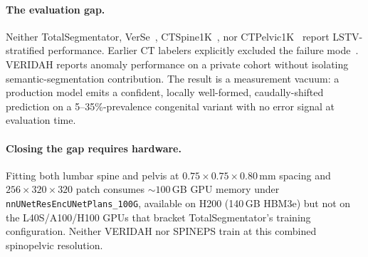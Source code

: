 \documentclass{article}
\newcommand{\SOTA}{TotalSegmentator}
\newcommand{\VERIDAH}{VERIDAH}
\newcommand{\VerSe}{VerSe}
\begin{document}
\paragraph{The evaluation gap.}
Neither \SOTA{}, \VerSe{}~\citep{Sekuboyina2021VerSe:Images},
CTSpine1K~\citep{Deng2021CTSpine1K:Tomography}, nor
CTPelvic1K~\citep{Liu2021DeepModels} report LSTV-stratified
performance. Earlier CT labelers explicitly excluded the
failure mode~\citep{Sekuboyina2020LabelingAnatomy}.
\VERIDAH{} reports anomaly performance on a private cohort
without isolating semantic-segmentation contribution. The
result is a measurement vacuum: a production model emits a
confident, locally well-formed, caudally-shifted prediction
on a 5--35\%-prevalence congenital variant with no error
signal at evaluation time.

\paragraph{Closing the gap requires hardware.}
Fitting both lumbar spine and pelvis at
$0.75{\times}0.75{\times}0.80$\,mm spacing and
$256{\times}320{\times}320$ patch consumes ${\sim}100$\,GB
GPU memory under \texttt{nnUNetResEncUNetPlans\_100G},
available on H200 (140\,GB HBM3e) but not on the
L40S/A100/H100 GPUs that bracket \SOTA{}'s training
configuration. Neither \VERIDAH{} nor SPINEPS train at this
combined spinopelvic resolution.
\end{document}
